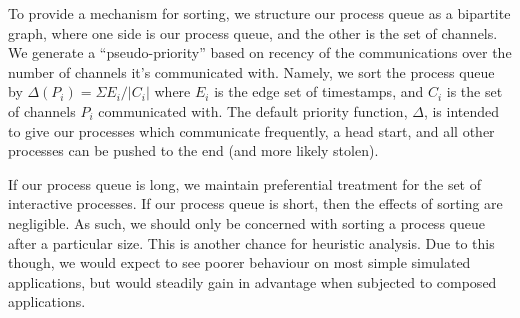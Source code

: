 To provide a mechanism for sorting, we structure our process queue as a bipartite 
graph, where one side is our process queue, and the other is the set of channels.
We generate a ``pseudo-priority'' based on recency of the communications over
the number of channels it's communicated with. Namely, we sort the process queue
by $\Delta(P_i) = \Sigma E_i / |C_i|$ where $E_i$ is the edge set of timestamps,
and $C_i$ is the set of channels $P_i$ communicated with. The default priority function, $\Delta$,
is intended to give our processes which communicate frequently, a head start, and
all other processes can be pushed to the end (and more likely stolen). 

If our process queue is long, we maintain preferential treatment for the set of 
interactive processes. If our process queue is short, then the effects of 
sorting are negligible. As such, we should only be concerned with sorting 
a process queue after a particular size. This is another chance for heuristic
analysis. Due to this though, we would expect to see poorer behaviour on most
simple simulated applications, but would steadily gain in advantage when 
subjected to composed applications.

